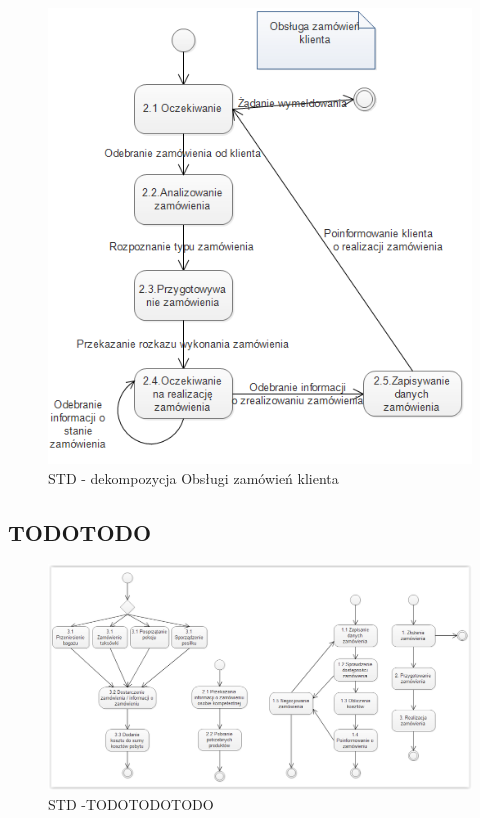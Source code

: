 \documentclass[a4paper, 11pt]{article}
\begin{document}
	\indent
	\begin{figure}[H]%
		\includegraphics[scale=1.0]{Img/STD-klient3.png}
		\caption{STD - dekompozycja Obsługi zamówień klienta}
	\end{figure}
	
		\subsection{TODOTODO}
		\indent
	\indent
	\begin{figure}[H]%
			\includegraphics[scale=0.8]{Img/STD-2-5.png}
			\caption{STD -TODOTODOTODO}
	\end{figure}
\end{document}
